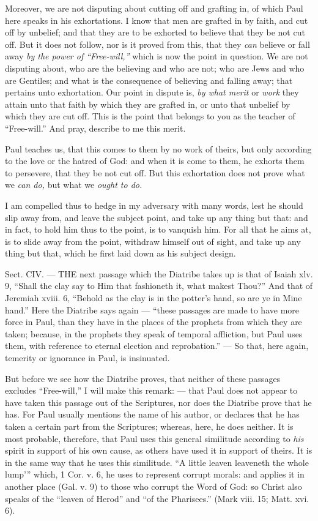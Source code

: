 Moreover, we are not disputing about cutting off and grafting in, of which Paul here speaks in his exhortations. I know that men are grafted in by faith, and cut off by unbelief; and that they are to be exhorted to believe that they be not cut off. But it does not follow, nor is it proved from this, that they \emph{can }believe or fall away \emph{ by the power of “Free-will,” }which is now the point in question. We are not disputing about, who are the believing and who are not; who are Jews and who are Gentiles; and what is the consequence of believing and falling away; that pertains unto exhortation. Our point in dispute is, \emph{by what merit }or \emph{work }they attain unto that faith by which they are grafted in, or unto that unbelief by which they are cut off. This is the point that belongs to you as the teacher of “Free-will.” And pray, describe to me this merit.

Paul teaches us, that this comes to them by no work of theirs, but only according to the love or the hatred of God: and when it is come to them, he exhorts them to persevere, that they be not cut off. But this exhortation does not prove what we \emph{can do, }but what we \emph{ought to do.}

I am compelled thus to hedge in my adversary with many words, lest he should slip away from, and leave the subject point, and take up any thing but that: and in fact, to hold him thus to the point, is to vanquish him. For all that he aims at, is to slide away from the point, withdraw himself out of sight, and take up any thing but that, which he first laid down as his subject design.


Sect. CIV. — THE next passage which the Diatribe takes up is that of Isaiah xlv. 9, “Shall the clay say to Him that fashioneth it, what makest Thou?” And that of Jeremiah xviii. 6, “Behold as the clay is in the potter’s hand, so are ye in Mine hand.” Here the Diatribe says again — “these passages are made to have more force in Paul, than they have in the places of the prophets from which they are taken; because, in the prophets they speak of temporal affliction, but Paul uses them, with reference to eternal election and reprobation.” — So that, here again, temerity or ignorance in Paul, is insinuated.

But before we see how the Diatribe proves, that neither of these passages excludes “Free-will,” I will make this remark: — that Paul does not appear to have taken this passage out of the Scriptures, nor does the Diatribe prove that he has. For Paul usually mentions the name of his author, or declares that he has taken a certain part from the Scriptures; whereas, here, he does neither. It is most probable, therefore, that Paul uses this general similitude according to \emph{his }spirit in support of his own cause, as others have used it in support of theirs. It is in the same way that he uses this similitude. “A little leaven leaveneth the whole lump’” which, 1 Cor. v. 6, he uses to represent corrupt morals: and applies it in another place (Gal. v. 9) to those who corrupt the Word of God: so Christ also speaks of the “leaven of Herod” and “of the Pharisees.” (Mark viii. 15; Matt. xvi. 6).

